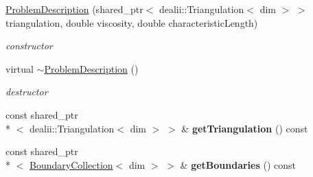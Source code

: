 \begin{DoxyCompactItemize}
\item 
\hypertarget{classnatrium_1_1ProblemDescription_aae378c7eb216b616de56dfcd162c02c2}{\hyperlink{classnatrium_1_1ProblemDescription_aae378c7eb216b616de56dfcd162c02c2}{Problem\-Description} (shared\-\_\-ptr$<$ dealii\-::\-Triangulation$<$ dim $>$ $>$ triangulation, double viscosity, double characteristic\-Length)}\label{classnatrium_1_1ProblemDescription_aae378c7eb216b616de56dfcd162c02c2}

\begin{DoxyCompactList}\small\item\em constructor \end{DoxyCompactList}\item 
\hypertarget{classnatrium_1_1ProblemDescription_a5270994970ddbd9f6fc98f292c1ccc0e}{virtual \hyperlink{classnatrium_1_1ProblemDescription_a5270994970ddbd9f6fc98f292c1ccc0e}{$\sim$\-Problem\-Description} ()}\label{classnatrium_1_1ProblemDescription_a5270994970ddbd9f6fc98f292c1ccc0e}

\begin{DoxyCompactList}\small\item\em destructor \end{DoxyCompactList}\item 
\hypertarget{classnatrium_1_1ProblemDescription_a69d3b6c08733468e6c9c152ce4f83585}{const shared\-\_\-ptr\\*
$<$ dealii\-::\-Triangulation$<$ dim $>$ $>$ \& {\bfseries get\-Triangulation} () const }\label{classnatrium_1_1ProblemDescription_a69d3b6c08733468e6c9c152ce4f83585}

\item 
\hypertarget{classnatrium_1_1ProblemDescription_abb061fe78c8d289fe2a4a9000015d842}{const shared\-\_\-ptr\\*
$<$ \hyperlink{classnatrium_1_1BoundaryCollection}{Boundary\-Collection}$<$ dim $>$ $>$ \& {\bfseries get\-Boundaries} () const }\label{classnatrium_1_1ProblemDescription_abb061fe78c8d289fe2a4a9000015d842}


\end{DoxyCompactItemize}
